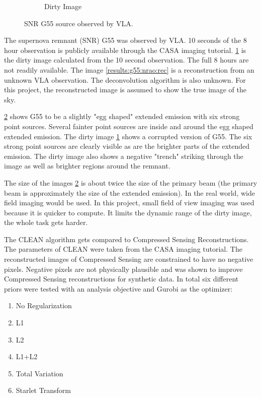 \begin{figure}[h]
\begin{subfigure}[b]{0.45\linewidth}
		\caption{Dirty Image}
		\label{results:g55:nrao:dirty}
	\end{subfigure}
	\caption{SNR G55 source observed by VLA.}
	\label{results:g55:nrao}
\end{figure}

The supernova remnant (SNR) G55 was observed by VLA. 10 seconds of the 8 hour observation is publicly available through the CASA imaging tutorial\cite{casaImagingGuide}. \ref{results:g55:nrao:dirty} is the dirty image calculated from the 10 second observation. The full 8 hours are not readily available. The image \ref{results:g55:nrao:rec} is a reconstruction from an unknown VLA observation. The deconvolution algorithm is also unknown. For this project, the reconstructed image is assumed to show the true image of the sky.

\ref{results:g55:nrao} shows G55 to be a slightly "egg shaped" extended emission with six strong point sources. Several fainter point sources are inside and around the egg shaped extended emission. The dirty image \ref{results:g55:nrao:dirty} shows a corrupted version of G55. The six strong point sources are clearly visible as are the brighter parts of the extended emission. The dirty image also shows a negative "trench" striking through the image as well as brighter regions around the remnant. 

The size of the images \ref{results:g55:nrao} is about twice the size of the primary beam (the primary beam is approximately the size of the extended emission). In the real world, wide field imaging would be used. In this project, small field of view imaging was used because it is quicker to compute. 
It limits the dynamic range of the dirty image, the whole task gets harder. 

The CLEAN algorithm gets compared to Compressed Sensing Reconstructions. The parameters of CLEAN were taken from the CASA imaging tutorial\cite{casaImagingGuide}. The reconstructed images of Compressed Sensing are constrained to have no negative pixels. Negative pixels are not physically plausible and was shown to improve Compressed Sensing reconstructions for synthetic data\cite{mcewen2011compressed}. In total six different priors were tested with an analysis objective and Gurobi as the optimizer:
\begin{enumerate}
	\item No Regularization
	\item L1
	\item L2
	\item L1+L2
	\item Total Variation
	\item Starlet Transform
\end{enumerate}

